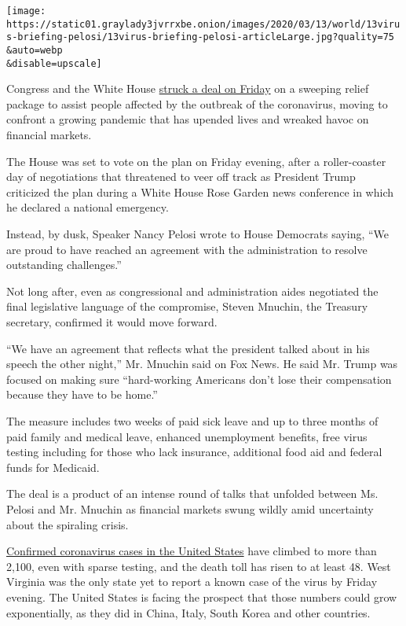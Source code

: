 \texttt{[image: https://static01.graylady3jvrrxbe.onion/images/2020/03/13/world/13virus-briefing-pelosi/13virus-briefing-pelosi-articleLarge.jpg?quality=75\\\&auto=webp\\\&disable=upscale]}

Congress and the White House
\href{https://www.nytimes3xbfgragh.onion/2020/03/13/us/politics/trump-coronavirus-relief-congress.html}{struck
a deal on Friday} on a sweeping relief package to assist people affected
by the outbreak of the coronavirus, moving to confront a growing
pandemic that has upended lives and wreaked havoc on financial markets.

The House was set to vote on the plan on Friday evening, after a
roller-coaster day of negotiations that threatened to veer off track as
President Trump criticized the plan during a White House Rose Garden
news conference in which he declared a national emergency.

Instead, by dusk, Speaker Nancy Pelosi wrote to House Democrats saying,
``We are proud to have reached an agreement with the administration to
resolve outstanding challenges.''

Not long after, even as congressional and administration aides
negotiated the final legislative language of the compromise, Steven
Mnuchin, the Treasury secretary, confirmed it would move forward.

``We have an agreement that reflects what the president talked about in
his speech the other night,'' Mr. Mnuchin said on Fox News. He said Mr.
Trump was focused on making sure ``hard-working Americans don't lose
their compensation because they have to be home.''

The measure includes two weeks of paid sick leave and up to three months
of paid family and medical leave, enhanced unemployment benefits, free
virus testing including for those who lack insurance, additional food
aid and federal funds for Medicaid.

The deal is a product of an intense round of talks that unfolded between
Ms. Pelosi and Mr. Mnuchin as financial markets swung wildly amid
uncertainty about the spiraling crisis.

\href{https://www.nytimes3xbfgragh.onion/interactive/2020/us/coronavirus-us-cases.html}{Confirmed
coronavirus cases in the United States} have climbed to more than 2,100,
even with sparse testing, and the death toll has risen to at least 48.
West Virginia was the only state yet to report a known case of the virus
by Friday evening. The United States is facing the prospect that those
numbers could grow exponentially, as they did in China, Italy, South
Korea and other countries.

